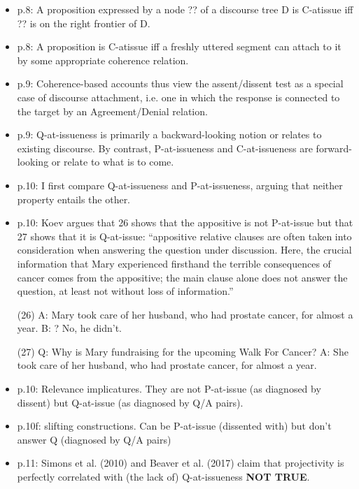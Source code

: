 \documentclass[11pt,fleqn]{article}
\newcommand{\6}{\mbox{$[\hspace*{-.6mm}[$}}
\newcommand{\9}{\mbox{$]\hspace*{-.6mm}]$}}
\begin{document}
\begin{itemize}
\begin{itemize}
\begin{itemize}
\item p.8:  A proposition expressed by a node ?? of a discourse tree D is C-atissue iff ?? is on the right frontier of D.

\item p.8: A proposition is C-atissue iff a freshly uttered segment can attach to it by some appropriate coherence relation.

\item p.9: Coherence-based accounts thus view the assent/dissent test as a special case of discourse attachment, i.e. one in which the response is connected to the target by an Agreement/Denial relation. 

\item p.9: Q-at-issueness is primarily a backward-looking notion or relates to existing discourse. By contrast, P-at-issueness and C-at-issueness are forward-looking or relate to what is to come. 

\item p.10: I first compare Q-at-issueness and P-at-issueness, arguing that neither property entails the other.

\item p.10: Koev argues that 26 shows that the appositive is not P-at-issue but that 27 shows that it is Q-at-issue: ``appositive relative clauses are often taken into consideration when answering the question under discussion. Here, the crucial information that Mary experienced firsthand the terrible consequences of cancer comes from the appositive; the main clause alone does not answer the question, at least not without loss of information.''

(26) A: Mary took care of her husband, who had prostate cancer, for almost a year. B: ? No, he didn't.

(27) Q: Why is Mary fundraising for the upcoming Walk For Cancer?
A: She took care of her husband, who had prostate cancer, for almost a year.

\item p.10: Relevance implicatures. They are not P-at-issue (as diagnosed by dissent) but Q-at-issue (as diagnosed by Q/A pairs).

\item p.10f: slifting constructions. Can be P-at-issue (dissented with) but don't answer Q (diagnosed by Q/A pairs)

\item p.11:  Simons et al. (2010) and Beaver et al. (2017) claim that projectivity is perfectly correlated with (the lack of) Q-at-issueness {\bf NOT TRUE}.


\end{itemize}
\end{itemize}
\end{itemize}
\end{document}
